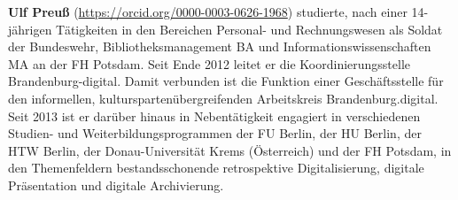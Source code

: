 \documentclass[a4paper,
fontsize=11pt,
oneside,
numbers=noperiodatend,
parskip=half-,
bibliography=totoc,
final
]{scrartcl}
\begin{document}
\textbf{Ulf Preuß} (\url{https://orcid.org/0000-0003-0626-1968}) studierte, nach einer
14-jährigen Tätigkeiten in den Bereichen Personal- und Rechnungswesen
als Soldat der Bundeswehr, Bibliotheksmanagement BA und
Informationswissenschaften MA an der FH Potsdam. Seit Ende 2012 leitet
er die Koordinierungsstelle Brandenburg-digital. Damit verbunden ist die
Funktion einer Geschäftsstelle für den informellen,
kulturspartenübergreifenden Arbeitskreis Brandenburg.digital. Seit 2013
ist er darüber hinaus in Nebentätigkeit engagiert in verschiedenen
Studien- und Weiterbildungsprogrammen der FU Berlin, der HU Berlin, der
HTW Berlin, der Donau-Universität Krems (Österreich) und der FH Potsdam,
in den Themenfeldern bestandsschonende retrospektive Digitalisierung,
digitale Präsentation und digitale Archivierung.
\end{document}
